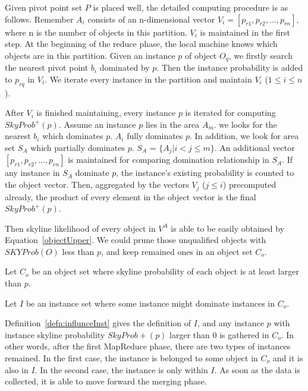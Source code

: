 

Given pivot point set $P$ is placed well, the detailed computing procedure is as follows. Remember $A_i$ consists of an n-dimensional vector $V_i = [p_{r1},p_{r2},\dots,p_{rn}]$, where n is the number of objects in this partition. $V_i$ is maintained in the first step. At the beginning of the reduce phase, the local machine knows which objects are in this partition. Given an instance $p$ of object $O_q$, we firstly search the nearest pivot point $b_i$ dominated by $p$. Then the instance probability is added to $p_{rq}$ in $V_i$. We iterate every instance in the partition and maintain $V_i$ ($ 1 \leq i \leq n$). 

After $V_i$ is finished maintaining, every instance $p$ is iterated for computing $SkyProb^+(p)$. Assume an instance $p$ lies in the area $A_m$. we looks for the nearest $b_i$ which dominates $p$. $A_i$ fully dominates $p$. In addition, we look for area set $S_A$ which partially dominates $p$. $S_A$ = $\{A_j| i < j \leq m \}$.
An additional vector $[p_{r1},p_{r2},\dots,p_{rn}]$ is maintained for comparing domination relationship in $S_A$. If any instance in $S_A$ dominate $p$, the instance's existing probability is counted to the object vector. Then, aggregated by the vectors $V_j$ ($j \leq i$) precomputed already, the product of every element in the object vector is the final $SkyProb^+(p)$.

Then skyline likelihood of every object in $V^A$ is able to be easily obtained by Equation~\ref{objectUpper}. We could prune those unqualified objects with $SKYProb(O)$ less than $p$, and keep remained ones in an object set $C_o$.

\begin{defn}
\label{defn:canObj}
Let $C_o$ be an object set where skyline probability of each object is at least larger than $p$.
\end{defn}

\begin{defn}
\label{defn:influnceInst}
Let $I$ be an instance set where some instance might dominate instances in $C_o$.
\end{defn}

Definition~\ref{defn:influnceInst} gives the definition of $I$, and any instance $p$ with instance skyline probability $SkyProb+(p)$ larger than $0$ is gathered in $C_o$. In other words, after the first MapReduce phase, there are two types of instances remained. In the first case, the instance is belonged to some object in $C_o$ and it is also in $I$. In the second case, the instance is only within $I$. As soon as the data is collected, it is able to move forward the merging phase.
